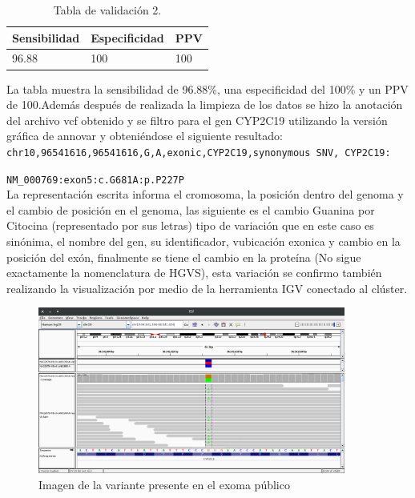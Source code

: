 \begin{table}[H]
	\begin{center}
		\begin{tabular}{|l|l|l|}
			\hline 
			\textbf{Sensibilidad} & \textbf{Especificidad} & \textbf{PPV} \\
			\hline 
			96.88 & 100 & 100 \\ \hline
		\end{tabular}
		\caption{Tabla de validación 2.}
		\label{tabla:tabla4}
	\end{center}
\end{table}

La tabla \label{tabla:tabla4} muestra la sensibilidad de 96.88\%, una especificidad del 100\% y un PPV de 100.Además después de realizada la limpieza de los datos se hizo la anotación del archivo vcf obtenido y se filtro para el gen CYP2C19 utilizando la versión gráfica de annovar \cite{Yang2015} y obteniéndose el siguiente resultado: \\

\texttt{chr10,96541616,96541616,G,A,exonic,CYP2C19,synonymous SNV, CYP2C19:}

\texttt{NM\_000769:exon5:c.G681A:p.P227P} \\

La representación escrita informa el cromosoma, la posición dentro del genoma y el cambio de posición en el genoma, las siguiente es el cambio Guanina por Citocina (representado por sus letras) tipo de variación que en este caso es sinónima, el nombre del gen, su identificador, vubicación exonica y cambio en la posición del exón, finalmente se tiene el cambio en la proteína (No sigue exactamente la nomenclatura de HGVS), esta variación se confirmo también realizando la visualización por medio de la herramienta IGV conectado al clúster.

\begin{figure}[H]
	\centering
	\includegraphics[width=0.9\textwidth]{Kap2/IGV}
	\caption{Imagen de la variante presente en el exoma público} \label{fig:igv}
\end{figure}

